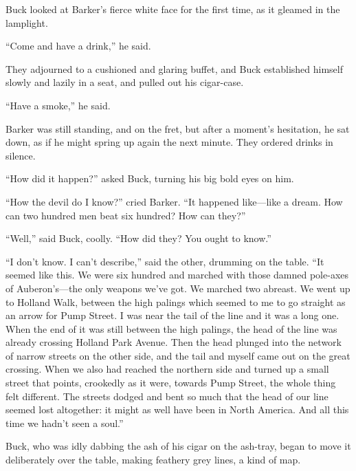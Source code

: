 \documentclass{book}
\begin{document}
Buck looked at Barker’s fierce white face for the first time, as it gleamed in the lamplight.

“Come and have a drink,” he said.

They adjourned to a cushioned and glaring buffet, and Buck established himself slowly and lazily in a seat, and pulled out his cigar-case.

“Have a smoke,” he said.

Barker was still standing, and on the fret, but after a moment’s hesitation, he sat down, as if he might spring up again the next minute. They ordered drinks in silence.

“How did it happen?” asked Buck, turning his big bold eyes on him.

“How the devil do I know?” cried Barker. “It happened like—like a dream. How can two hundred men beat six hundred? How can they?”

“Well,” said Buck, coolly. “How did they? You ought to know.”

“I don’t know. I can’t describe,” said the other, drumming on the table. “It seemed like this. We were six hundred and marched with those damned pole-axes of Auberon’s—the only weapons we’ve got. We marched two abreast. We went up to Holland Walk, between the high palings which seemed to me to go straight as an arrow for Pump Street. I was near the tail of the line and it was a long one. When the end of it was still between the high palings, the head of the line was already crossing Holland Park Avenue. Then the head plunged into the network of narrow streets on the other side, and the tail and myself came out on the great crossing. When we also had reached the northern side and turned up a small street that points, crookedly as it were, towards Pump Street, the whole thing felt different. The streets dodged and bent so much that the head of our line seemed lost altogether: it might as well have been in North America. And all this time we hadn’t seen a soul.”

Buck, who was idly dabbing the ash of his cigar on the ash-tray, began to move it deliberately over the table, making feathery grey lines, a kind of map.
\end{document}
